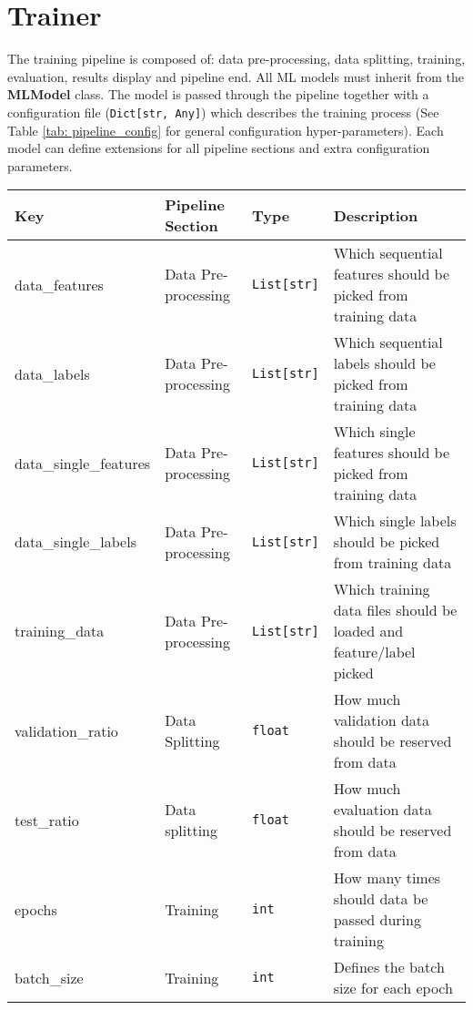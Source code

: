 \section{Trainer}

The training pipeline is composed of: data pre-processing, data splitting, training, evaluation, results display and pipeline end. All ML models must inherit from the \textbf{MLModel} class. The model is passed through the pipeline together with a configuration file (\texttt{Dict[str, Any]}) which describes the training process (See Table \ref{tab: pipeline_config} for general configuration hyper-parameters). Each model can define extensions for all pipeline sections and extra configuration parameters. 

\begin{table}[h!]
    \centerfloat
    \begin{tabular}{|M{3.2cm}|M{2.3cm}|M{3.3cm}|M{4.4cm}|}
         \hline
         \textbf{Key} & \textbf{Pipeline Section} & \textbf{Type} & \textbf{Description} \\
         \hline
         data\_features & Data Pre-processing & \texttt{List[str]} & Which sequential features should be picked from training data \\
         \hline
         data\_labels & Data Pre-processing & \texttt{List[str]} & Which sequential labels should be picked from training data \\
         \hline
         data\_single\_features & Data Pre-processing & \texttt{List[str]} & Which single features should be picked from training data \\
         \hline
         data\_single\_labels & Data Pre-processing & \texttt{List[str]} & Which single labels should be picked from training data \\
         \hline
         training\_data & Data Pre-processing & \texttt{List[str]} & Which training data files should be loaded and feature/label picked\\
         \hline
         validation\_ratio & Data Splitting & \texttt{float} & How much validation data should be reserved from data \\
         \hline
         test\_ratio & Data splitting & \texttt{float} & How much evaluation data should be reserved from data \\
         \hline
         epochs & Training & \texttt{int} & How many times should data be passed during training\\
         \hline
         batch\_size & Training & \texttt{int} & Defines the batch size for each epoch \\

\end{tabular}
\end{table}
